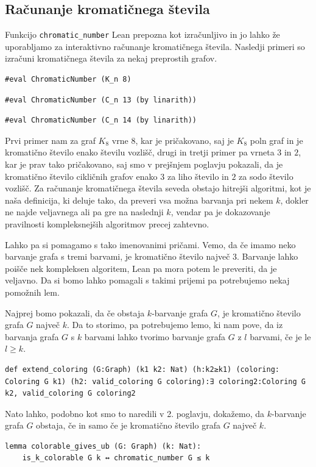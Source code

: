 \documentclass[mat1]{fmfdelo}
\begin{document}
\subsection{Računanje kromatičnega števila}
Funkcijo \lstinline{chromatic_number} Lean prepozna kot izračunljivo in jo lahko že uporabljamo za interaktivno računanje
kromatičnega števila. Nasledji primeri so izračuni kromatičnega števila za nekaj preprostih grafov.
\begin{lstlisting}
#eval ChromaticNumber (K_n 8)
\end{lstlisting}
\begin{lstlisting}
#eval ChromaticNumber (C_n 13 (by linarith))
\end{lstlisting}
\begin{lstlisting}
#eval ChromaticNumber (C_n 14 (by linarith))
\end{lstlisting}
Prvi primer nam za graf $K_8$ vrne 8, kar je pričakovano, saj je $K_8$ poln graf in je kromatično število enako številu vozlišč, 
drugi in tretji primer pa vrneta $3$ in $2$, kar je prav tako pričakovano, saj smo v prejšnjem poglavju pokazali, 
da je kromatično število cikličnih grafov enako $3$ za liho število in $2$ za sodo število vozlišč.
Za računanje kromatičnega števila seveda obstajo hitrejši algoritmi, kot je naša definicija, 
ki deluje tako, da preveri vsa možna barvanja pri nekem $k$, dokler ne najde veljavnega ali pa gre 
na naslednji $k$, vendar pa je dokazovanje pravilnosti kompleksnejših algoritmov precej zahtevno.

Lahko pa si pomagamo s tako imenovanimi pričami. Vemo, da če imamo neko barvanje grafa s tremi barvami, je kromatično število največ 3. 
Barvanje lahko poišče nek kompleksen algoritem, Lean pa mora potem le preveriti, da je veljavno. Da si bomo lahko pomagali s takimi
prijemi pa potrebujemo nekaj pomožnih lem. 

Najprej bomo pokazali, da če obstaja $k$-barvanje grafa $G$, je kromatično število grafa $G$ največ $k$. Da to storimo, pa potrebujemo
lemo, ki nam pove, da iz barvanja grafa $G$ s $k$ barvami lahko tvorimo barvanje grafa $G$ z $l$ barvami, če je le $l\geq k$.
\begin{lstlisting}
def extend_coloring (G:Graph) (k1 k2: Nat) (h:k2≥k1) (coloring: Coloring G k1) (h2: valid_coloring G coloring):∃ coloring2:Coloring G k2, valid_coloring G coloring2
\end{lstlisting}
Nato lahko, podobno kot smo to naredili v 2. poglavju, dokažemo, da $k$-barvanje grafa $G$ obstaja, če in samo če je kromatično število grafa $G$ največ $k$.
\begin{lstlisting}
lemma colorable_gives_ub (G: Graph) (k: Nat):
    is_k_colorable G k ↔ chromatic_number G ≤ k
\end{lstlisting}
\end{document}
